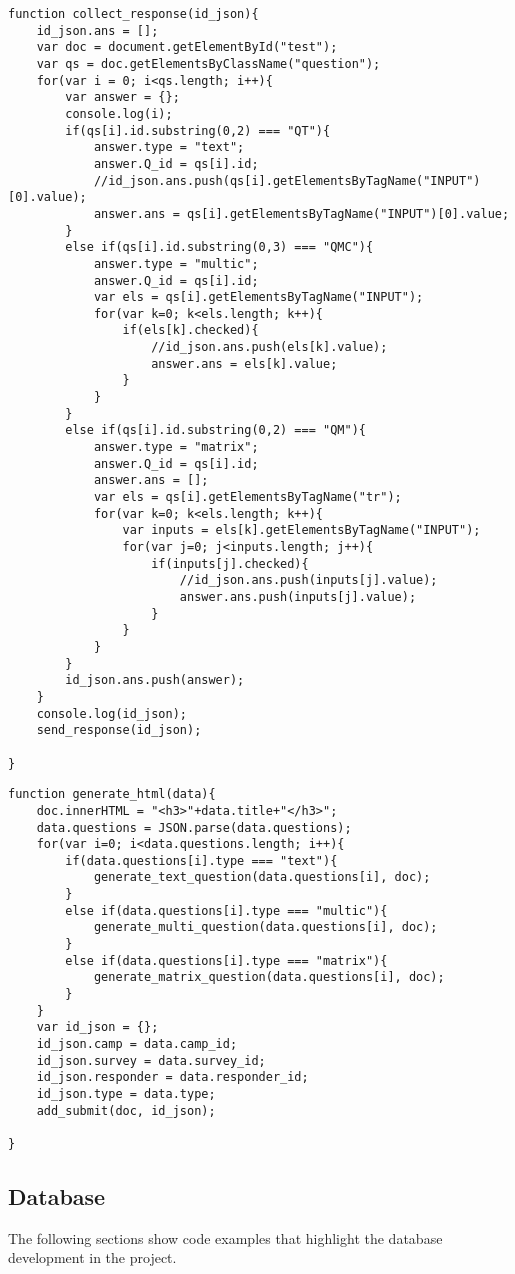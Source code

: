 \documentclass[../final.tex]{subfiles}
\begin{document}
\begin{lstlisting}
function collect_response(id_json){
	id_json.ans = [];
	var doc = document.getElementById("test");
	var qs = doc.getElementsByClassName("question");
	for(var i = 0; i<qs.length; i++){
		var answer = {};
		console.log(i);
		if(qs[i].id.substring(0,2) === "QT"){
			answer.type = "text";
			answer.Q_id = qs[i].id;
			//id_json.ans.push(qs[i].getElementsByTagName("INPUT")[0].value);
			answer.ans = qs[i].getElementsByTagName("INPUT")[0].value;
		}
		else if(qs[i].id.substring(0,3) === "QMC"){
			answer.type = "multic";
			answer.Q_id = qs[i].id;
			var els = qs[i].getElementsByTagName("INPUT");
			for(var k=0; k<els.length; k++){
				if(els[k].checked){
					//id_json.ans.push(els[k].value);
					answer.ans = els[k].value;
				}
			}
		}
		else if(qs[i].id.substring(0,2) === "QM"){
			answer.type = "matrix";
			answer.Q_id = qs[i].id;
			answer.ans = [];
			var els = qs[i].getElementsByTagName("tr");
			for(var k=0; k<els.length; k++){
				var inputs = els[k].getElementsByTagName("INPUT");
				for(var j=0; j<inputs.length; j++){
					if(inputs[j].checked){
						//id_json.ans.push(inputs[j].value);
						answer.ans.push(inputs[j].value);
					}
				}
			}
		}
		id_json.ans.push(answer);
	}
	console.log(id_json);
	send_response(id_json);
	
}

\end{lstlisting}
\begin{lstlisting}
function generate_html(data){
	doc.innerHTML = "<h3>"+data.title+"</h3>";
	data.questions = JSON.parse(data.questions);
	for(var i=0; i<data.questions.length; i++){
		if(data.questions[i].type === "text"){
			generate_text_question(data.questions[i], doc);
		}
		else if(data.questions[i].type === "multic"){
			generate_multi_question(data.questions[i], doc);
		}
		else if(data.questions[i].type === "matrix"){
			generate_matrix_question(data.questions[i], doc);
		}
	}
	var id_json = {};
	id_json.camp = data.camp_id;
	id_json.survey = data.survey_id;
	id_json.responder = data.responder_id;
	id_json.type = data.type;
	add_submit(doc, id_json);

}

\end{lstlisting}
\subsection{Database}
The following sections show code examples that highlight the database development in the project.
\end{document}
